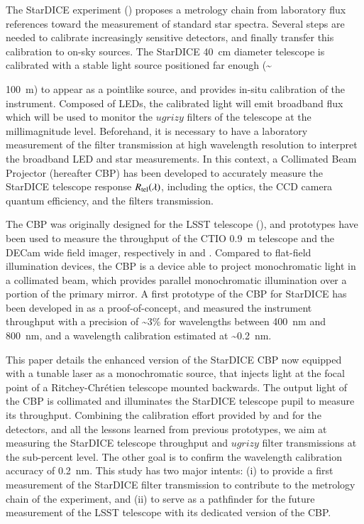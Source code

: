 The StarDICE experiment (\citealt{Betoule_2023}) proposes a metrology chain from laboratory flux references toward the measurement of standard star spectra. Several steps are needed to calibrate increasingly sensitive detectors, and finally transfer this calibration to on-sky sources. The StarDICE \SI{40}{\centi\meter} diameter telescope is calibrated with a stable light source positioned far enough (\textasciitilde {\SI{100}{\meter}) to appear as a pointlike source, and provides in-situ calibration of the instrument. Composed of LEDs, the calibrated light will emit broadband flux which will be used to monitor the $ugrizy$ filters of the \SD{} telescope at the millimagnitude level. Beforehand, it is necessary to have a laboratory measurement of the filter transmission at high wavelength resolution to interpret the broadband LED and star measurements. In this context, a Collimated Beam Projector (hereafter CBP) has been developed to accurately measure the StarDICE telescope response $R_{\mathrm{tel}}(\lambda)$, including the optics, the CCD camera quantum efficiency, and the filters transmission. 

The CBP was originally designed for the LSST telescope (\citealt{ingraham2016}), and prototypes have been used to measure the throughput of the CTIO \SI{0.9}{\meter} telescope and the DECam wide field imager, respectively in \cite{coughlin2018} and \cite{coughlin2016}. Compared to flat-field illumination devices, the CBP is a device able to project monochromatic light in a collimated beam, which provides parallel monochromatic illumination over a portion of the primary mirror. A first prototype of the CBP for StarDICE has been developed in \cite{Mondrik_2023} as a proof-of-concept, and measured the instrument throughput with a precision of \textasciitilde 3\% for wavelengths between \SI{400}{\nano\meter} and \SI{800}{\nano\meter}, and a wavelength calibration estimated at \textasciitilde \SI{0.2}{\nano\meter}. 

This paper details the enhanced version of the StarDICE CBP now equipped with a tunable laser as a monochromatic source, that injects light at the focal point of a Ritchey-Chrétien telescope mounted backwards. The output light of the CBP is collimated and illuminates the StarDICE telescope pupil to measure its throughput. Combining the calibration effort provided by \cite{houston2008detectors} and \cite{solarcell} for the detectors, and all the lessons learned from previous prototypes, we aim at measuring the StarDICE telescope throughput and $ugrizy$ filter transmissions at the sub-percent level. The other goal is to confirm the wavelength calibration accuracy of \SI{0.2}{\nano\meter}. This study has two major intents: (i) to provide a first measurement of the StarDICE filter transmission to contribute to the metrology chain of the experiment, and (ii) to serve as a pathfinder for the future measurement of the LSST telescope with its dedicated version of the CBP.

}
